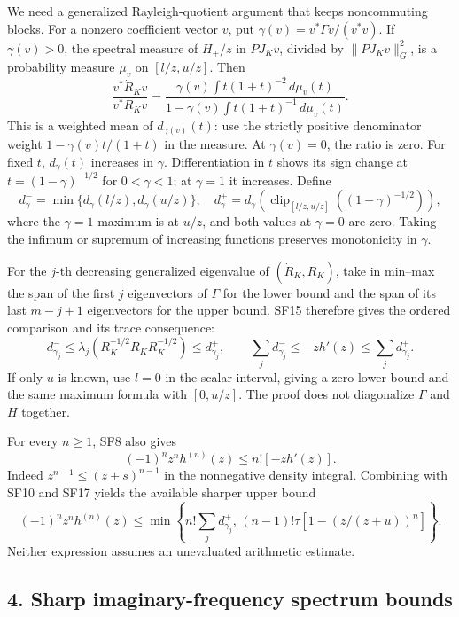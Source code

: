 \documentclass[10pt]{article}
\begin{document}
We need a generalized Rayleigh-quotient argument that keeps noncommuting blocks. For a nonzero coefficient vector \(v\), put \(\gamma(v)=v^*\Gamma v/(v^*v)\). If \(\gamma(v)>0\), the spectral measure of \(H_+/z\) in \(PJ_Kv\), divided by \(\|PJ_Kv\|_G^2\), is a probability measure \(\mu_v\) on \([l/z,u/z]\). Then \[
 \frac{v^*\dot R_Kv}{v^*R_Kv}
 =\frac{\gamma(v)\int t(1+t)^{-2}\,d\mu_v(t)}
 {1-\gamma(v)\int t(1+t)^{-1}\,d\mu_v(t)} .
 \tag{SF15}
\] This is a weighted mean of \(d_{\gamma(v)}(t)\): use the strictly positive denominator weight \(1-\gamma(v)t/(1+t)\) in the measure. At \(\gamma(v)=0\), the ratio is zero. For fixed \(t\), \(d_\gamma(t)\) increases in \(\gamma\). Differentiation in \(t\) shows its sign change at \(t=(1-\gamma)^{-1/2}\) for \(0<\gamma<1\); at \(\gamma=1\) it increases. Define \[
 d_\gamma^-=\min\{d_\gamma(l/z),d_\gamma(u/z)\},\quad
 d_\gamma^+=d_\gamma\!\left(
 \operatorname{clip}_{[l/z,u/z]}((1-\gamma)^{-1/2})\right),
 \tag{SF16}
\] where the \(\gamma=1\) maximum is at \(u/z\), and both values at \(\gamma=0\) are zero. Taking the infimum or supremum of increasing functions preserves monotonicity in \(\gamma\).

For the \(j\)-th decreasing generalized eigenvalue of \((\dot R_K,R_K)\), take in min--max the span of the first \(j\) eigenvectors of \(\Gamma\) for the lower bound and the span of its last \(m-j+1\) eigenvectors for the upper bound. SF15 therefore gives the ordered comparison and its trace consequence: \[
 d_{\gamma_j}^-\le
 \lambda_j(R_K^{-1/2}\dot R_KR_K^{-1/2})
 \le d_{\gamma_j}^+,\qquad
 \sum_jd_{\gamma_j}^-\le-zh'(z)\le\sum_jd_{\gamma_j}^+ .
 \tag{SF17}
\] If only \(u\) is known, use \(l=0\) in the scalar interval, giving a zero lower bound and the same maximum formula with \([0,u/z]\). The proof does not diagonalize \(\Gamma\) and \(H\) together.

For every \(n\ge1\), SF8 also gives \[
 (-1)^nz^nh^{(n)}(z)\le n![-zh'(z)].
\] Indeed \(z^{n-1}\le(z+s)^{n-1}\) in the nonnegative density integral. Combining with SF10 and SF17 yields the available sharper upper bound \[
 (-1)^nz^nh^{(n)}(z)
 \le\min\left\{
 n!\sum_jd_{\gamma_j}^+,\,
 (n-1)!\tau[1-(z/(z+u))^n]\right\}.
 \tag{SF18}
\] Neither expression assumes an unevaluated arithmetic estimate.

\subsection{4. Sharp imaginary-frequency spectrum bounds}\label{sharp-imaginary-frequency-spectrum-bounds}
\end{document}

